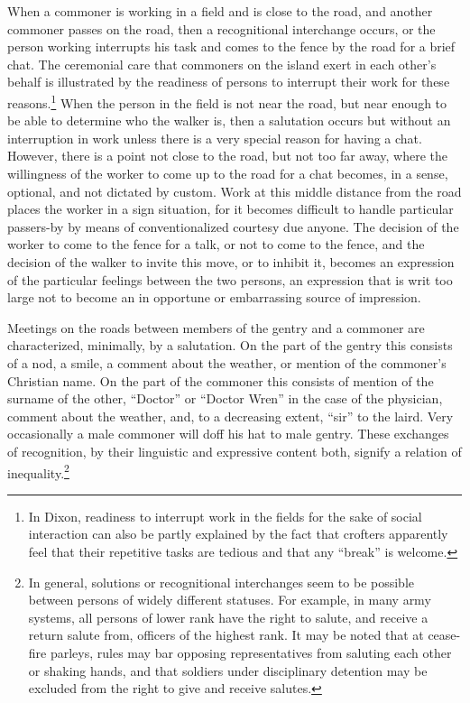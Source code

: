\documentclass[twoside,symmetric,nobib,justified]{tufte-book}
\begin{document}
\enlargethispage{\baselineskip}

When a commoner is working in a field and is close to the road, and
another commoner passes on the road, then a recognitional interchange
occurs, or the person working interrupts his task and comes to the fence
by the road for a brief chat. The ceremonial care that commoners on the
island exert in each other's behalf is illustrated by the readiness of
persons to interrupt their work for these reasons.\footnote{In Dixon,
  readiness to interrupt work in the fields for the sake of social
  interaction can also be partly explained by the fact that crofters
  apparently feel that their repetitive tasks are tedious and that any
  ``break'' is welcome.} When the person in the field is not near the
road, but near enough to be able to determine who the walker is, then a
salutation occurs but without an interruption in work unless there is a
very special reason for having a chat. However, there is a point not
close to the road, but not too far away, where the willingness of the
worker to come up to the road for a chat becomes, in a sense, optional,
and not dictated by custom. Work at this middle distance from the road
places the worker in a sign situation, for it becomes difficult to
handle particular passers-by by means of conventionalized courtesy due
anyone. The decision of the worker to come to the fence for a talk, or
not to come to the fence, and the decision of the walker to invite this
move, or to inhibit it, becomes an expression of the particular feelings
between the two persons, an expression that is writ too large not to
become an in opportune or embarrassing source of impression.

Meetings on the roads between members of the gentry and a commoner are
characterized, minimally, by a salutation. On the part of the gentry
this consists of a nod, a smile, a comment about the weather, or mention
of the commoner's Christian name. On the part of the commoner this
consists of mention of the surname of the other, ``Doctor'' or ``Doctor
Wren'' in the case of the physician, comment about the weather, and, to
a decreasing extent, ``sir'' to the laird. Very occasionally a male
commoner will doff his hat to male gentry. These exchanges of
recognition, by their linguistic and expressive content both, signify a
relation of inequality.\footnote{In general, solutions or recognitional
  interchanges seem to be possible between persons of widely different
  statuses. For example, in many army systems, all persons of lower rank
  have the right to salute, and receive a return salute from, officers
  of the highest rank. It may be noted that at cease-fire parleys, rules
  may bar opposing representatives from saluting each other or shaking
  hands, and that soldiers under disciplinary detention may be excluded
  from the right to give and receive salutes.}
\end{document}
